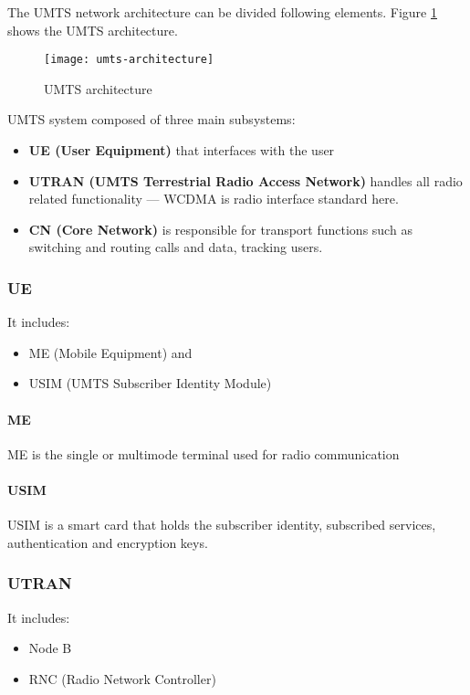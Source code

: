 The UMTS network architecture can be divided following elements. Figure \ref{fig:umts-architecture} shows the UMTS architecture.




\begin{figure}[hpt]
	\centering
	\texttt{[image: umts-architecture]}
	\caption{UMTS architecture}\label{fig:umts-architecture}
\end{figure}
UMTS system composed of three main subsystems:
\begin{itemize}
	\item \textbf{UE (User Equipment)} that interfaces with the user
	\item \textbf{UTRAN (UMTS Terrestrial Radio Access Network)} handles all radio related functionality — WCDMA is radio interface standard here.
	\item \textbf{CN (Core Network)} is responsible for transport functions such as	switching and routing calls and data, tracking users.
\end{itemize}

\subsubsection{UE}
It includes:
\begin{itemize}
	\item ME (Mobile Equipment) and
	\item USIM (UMTS Subscriber Identity Module)
\end{itemize}

\paragraph{ME}
ME is the single or multimode terminal used for radio communication

\paragraph{USIM}
USIM is a smart card that holds the subscriber identity, subscribed services, authentication and encryption keys. 


\subsubsection{UTRAN}
It includes:
\begin{itemize}
	\item Node B
	\item RNC (Radio Network Controller)
\end{itemize}

